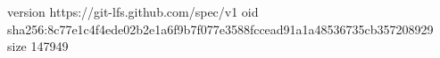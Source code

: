 version https://git-lfs.github.com/spec/v1
oid sha256:8c77e1c4f4ede02b2e1a6f9b7f077e3588fccead91a1a48536735cb357208929
size 147949
